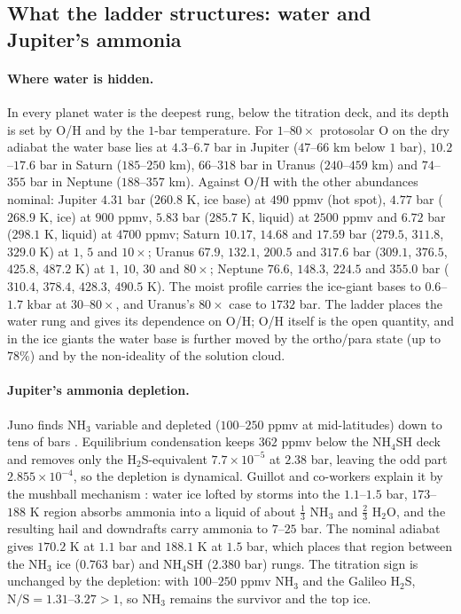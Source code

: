 \documentclass[11pt]{article}
\theoremstyle{definition}\newtheorem{definition}[theorem]{Definition}
\theoremstyle{remark}\newtheorem{remark}[theorem]{Remark}
\begin{document}
\subsection{What the ladder structures: water and Jupiter's ammonia}\label{sec:structures}
\paragraph{Where water is hidden.} In every planet water is the deepest rung, below the titration deck, and its depth is set by O/H and by the $1$-bar temperature. For $1$--$80\times$ protosolar O on the dry adiabat the water base lies at $4.3$--$6.7$ bar in Jupiter ($47$--$66$ km below $1$ bar), $10.2$--$17.6$ bar in Saturn ($185$--$250$ km), $66$--$318$ bar in Uranus ($240$--$459$ km) and $74$--$355$ bar in Neptune ($188$--$357$ km). Against O/H with the other abundances nominal: Jupiter $4.31$ bar ($260.8$ K, ice base) at $490$ ppmv (hot spot), $4.77$ bar ($268.9$ K, ice) at $900$ ppmv, $5.83$ bar ($285.7$ K, liquid) at $2500$ ppmv and $6.72$ bar ($298.1$ K, liquid) at $4700$ ppmv; Saturn $10.17$, $14.68$ and $17.59$ bar ($279.5$, $311.8$, $329.0$ K) at $1$, $5$ and $10\times$; Uranus $67.9$, $132.1$, $200.5$ and $317.6$ bar ($309.1$, $376.5$, $425.8$, $487.2$ K) at $1$, $10$, $30$ and $80\times$; Neptune $76.6$, $148.3$, $224.5$ and $355.0$ bar ($310.4$, $378.4$, $428.3$, $490.5$ K). The moist profile carries the ice-giant bases to $0.6$--$1.7$ kbar at $30$--$80\times$, and Uranus's $80\times$ case to $1732$ bar. The ladder places the water rung and gives its dependence on O/H; O/H itself is the open quantity, and in the ice giants the water base is further moved by the ortho/para state (up to $78\%$) and by the non-ideality of the solution cloud.

\paragraph{Jupiter's ammonia depletion.} Juno finds NH$_3$ variable and depleted ($100$--$250$ ppmv at mid-latitudes) down to tens of bars \cite{Li2017,Guillot2020b}. Equilibrium condensation keeps $362$ ppmv below the NH$_4$SH deck and removes only the H$_2$S-equivalent $7.7\times10^{-5}$ at $2.38$ bar, leaving the odd part $2.855\times10^{-4}$, so the depletion is dynamical. Guillot and co-workers explain it by the mushball mechanism \cite{Guillot2020a,Guillot2020b}: water ice lofted by storms into the $1.1$--$1.5$ bar, $173$--$188$ K region absorbs ammonia into a liquid of about $\frac13$ NH$_3$ and $\frac23$ H$_2$O, and the resulting hail and downdrafts carry ammonia to $7$--$25$ bar. The nominal adiabat gives $170.2$ K at $1.1$ bar and $188.1$ K at $1.5$ bar, which places that region between the NH$_3$ ice ($0.763$ bar) and NH$_4$SH ($2.380$ bar) rungs. The titration sign is unchanged by the depletion: with $100$--$250$ ppmv NH$_3$ and the Galileo H$_2$S, $\mathrm N/\mathrm S=1.31$--$3.27>1$, so NH$_3$ remains the survivor and the top ice.
\end{document}
